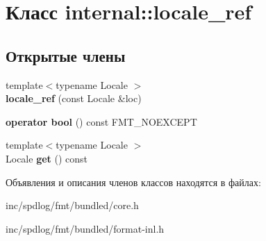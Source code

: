 \hypertarget{classinternal_1_1locale__ref}{}\section{Класс internal\+:\+:locale\+\_\+ref}
\label{classinternal_1_1locale__ref}
\subsection*{Открытые члены}
\begin{DoxyCompactItemize}
\item 
\mbox{\label{classinternal_1_1locale__ref_a8de4765ebdb0405dd476e1290e28d7b3}} 
{\footnotesize template$<$typename Locale $>$ }\\{\bfseries locale\+\_\+ref} (const Locale \&loc)
\item 
\mbox{\label{classinternal_1_1locale__ref_a76abc5a68192c89632b42004063d2bcb}} 
{\bfseries operator bool} () const F\+M\+T\+\_\+\+N\+O\+E\+X\+C\+E\+PT
\item 
\mbox{\label{classinternal_1_1locale__ref_a25f8bf16278b8cd7c083aae1a11c49e0}} 
{\footnotesize template$<$typename Locale $>$ }\\Locale {\bfseries get} () const
\end{DoxyCompactItemize}


Объявления и описания членов классов находятся в файлах\+:\begin{DoxyCompactItemize}
\item 
inc/spdlog/fmt/bundled/core.\+h\item 
inc/spdlog/fmt/bundled/format-\/inl.\+h\end{DoxyCompactItemize}
